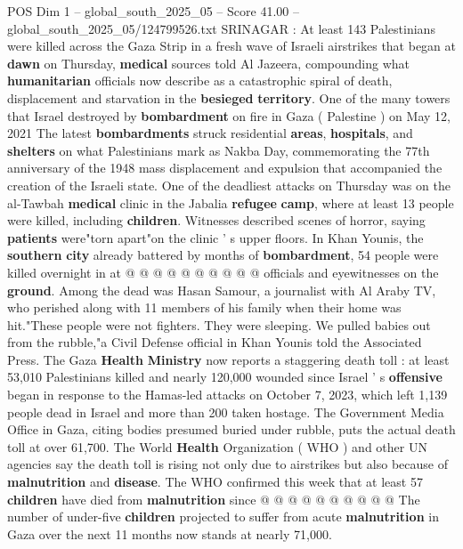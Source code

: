 \begin{textsample}{POS Dim 1 – global\_south\_2025\_05 – Score 41.00 – global\_south\_2025\_05/124799526.txt}  \label{ex:f1_pos_061}
SRINAGAR : At least 143 Palestinians were killed across the Gaza Strip in a fresh wave of Israeli airstrikes that began at \textbf{dawn} on Thursday, \textbf{medical} sources told Al Jazeera, compounding what \textbf{humanitarian} officials now describe as a catastrophic spiral of death, displacement and starvation in the \textbf{besieged} \textbf{territory}.
One of the many towers that Israel destroyed by \textbf{bombardment} on fire in Gaza ( Palestine ) on May 12, 2021 The latest \textbf{bombardments} struck residential \textbf{areas}, \textbf{hospitals}, and \textbf{shelters} on what Palestinians mark as Nakba Day, commemorating the 77th anniversary of the 1948 mass displacement and expulsion that accompanied the creation of the Israeli state.
One of the deadliest attacks on Thursday was on the al-Tawbah \textbf{medical} clinic in the Jabalia \textbf{refugee} \textbf{camp}, where at least 13 people were killed, including \textbf{children}.
Witnesses described scenes of horror, saying \textbf{patients} were"torn apart"on the clinic ' s upper floors.
In Khan Younis, the \textbf{southern} \textbf{city} already battered by months of \textbf{bombardment}, 54 people were killed overnight in at @ @ @ @ @ @ @ @ @ @ officials and eyewitnesses on the \textbf{ground}.
Among the dead was Hasan Samour, a journalist with Al Araby TV, who perished along with 11 members of his family when their home was hit."These people were not fighters.
They were sleeping.
We pulled babies out from the rubble,"a Civil Defense official in Khan Younis told the Associated Press.
The Gaza \textbf{Health} \textbf{Ministry} now reports a staggering death toll : at least 53,010 Palestinians killed and nearly 120,000 wounded since Israel ' s \textbf{offensive} began in response to the Hamas-led attacks on October 7, 2023, which left 1,139 people dead in Israel and more than 200 taken hostage.
The Government Media Office in Gaza, citing bodies presumed buried under rubble, puts the actual death toll at over 61,700.
The World \textbf{Health} Organization ( WHO ) and other UN agencies say the death toll is rising not only due to airstrikes but also because of \textbf{malnutrition} and \textbf{disease}.
The WHO confirmed this week that at least 57 \textbf{children} have died from \textbf{malnutrition} since @ @ @ @ @ @ @ @ @ @ The number of under-five \textbf{children} projected to suffer from acute \textbf{malnutrition} in Gaza over the next 11 months now stands at nearly 71,000.

\end{textsample}
